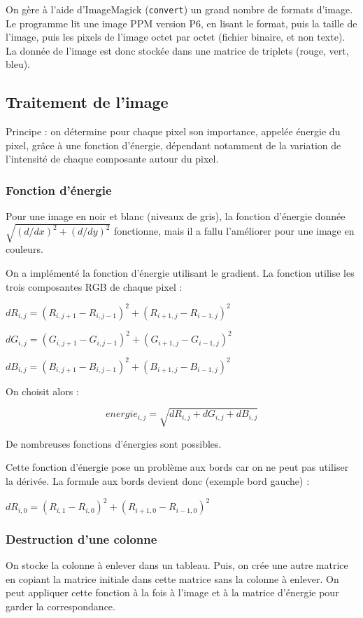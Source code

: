 \documentclass[a4paper]{article}
\begin{document}
On gère à l'aide d'ImageMagick ({\tt convert}) un grand nombre de formats d'image. Le programme lit une image PPM version P6, en lisant le format, puis la taille de l'image, puis les pixels de l'image octet par octet (fichier binaire, et non texte). La donnée de l'image est donc stockée dans une matrice de triplets (rouge, vert, bleu).


\subsection{Traitement de l'image}

Principe : on détermine pour chaque pixel son importance, appelée énergie du pixel, grâce à une fonction d'énergie, dépendant notamment de la variation de l'intensité de chaque composante autour du pixel.

\subsubsection{Fonction d'énergie}

Pour une image en noir et blanc (niveaux de gris), la fonction d'énergie donnée $\sqrt{(d/dx)^2+(d/dy)^2}$ fonctionne, mais il a fallu l'améliorer pour une image en couleurs.

On a implémenté la fonction d'énergie utilisant le gradient. La fonction utilise les trois composantes RGB de chaque pixel :

$dR_{i,j} = (R_{i,j+1} - R_{i,j-1})^2 + (R_{i+1,j} - R_{i-1,j})^2$

$dG_{i,j} = (G_{i,j+1} - G_{i,j-1})^2 + (G_{i+1,j} - G_{i-1,j})^2$

$dB_{i,j} = (B_{i,j+1} - B_{i,j-1})^2 + (B_{i+1,j} - B_{i-1,j})^2$

On choisit alors :

\[energie_{i,j} = \sqrt{dR_{i,j} + dG_{i,j} + dB_{i,j}}\]

De nombreuses fonctions d'énergies sont possibles.

Cette fonction d'énergie pose un problème aux bords car on ne peut pas utiliser la dérivée. La formule aux bords devient donc (exemple bord gauche) :

$dR_{i,0} = (R_{i,1} - R_{i,0})^2 + (R_{i+1,0} - R_{i-1,0})^2$


\subsubsection{Destruction d'une colonne}

On stocke la colonne à enlever dans un tableau. Puis, on crée une autre matrice en copiant la matrice initiale dans cette matrice sans la colonne à enlever. On peut appliquer cette fonction à la fois à l'image et à la matrice d'énergie pour garder la correspondance.
\end{document}
